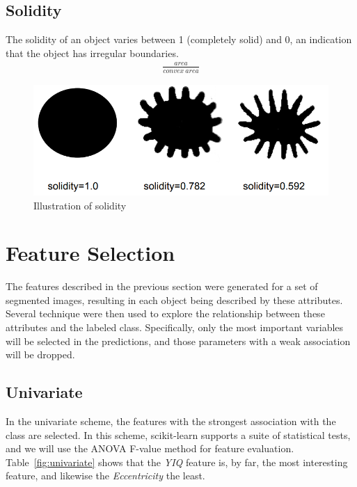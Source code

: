 \documentclass[letterpaper]{article}
\begin{document}
{\subsection{Solidity}
The solidity of an object varies between 1 (completely solid) and 0, an indication that the object has irregular boundaries.
\begin{eqnarray*}
\frac {area} {convex\ area}
\end{eqnarray*}
\begin{figure}[H]
	\centering
	\includegraphics[width=0.4\linewidth]{./figures/solidity.png}
	\caption{Illustration of solidity \protect\cite{Wirth2004-li} }
	\label{fig:solidity}
\end{figure}

\section{Feature Selection}
The features described in the previous section were generated for a set of segmented images, resulting in each object being described by these attributes. Several technique were then used to explore the relationship between these attributes and the labeled class. Specifically, only the most important variables will be selected in the predictions, and those parameters with a weak association will be dropped.
\subsection{Univariate}
In the univariate scheme, the features with the strongest association with the class are selected. In this scheme, scikit-learn supports a suite of statistical tests, and we will use the ANOVA F-value method for feature evaluation. Table~\ref{fig:univariate} shows that the {\it YIQ} feature is, by far, the most interesting feature, and likewise the {\it Eccentricity} the least.

}
\end{document}
